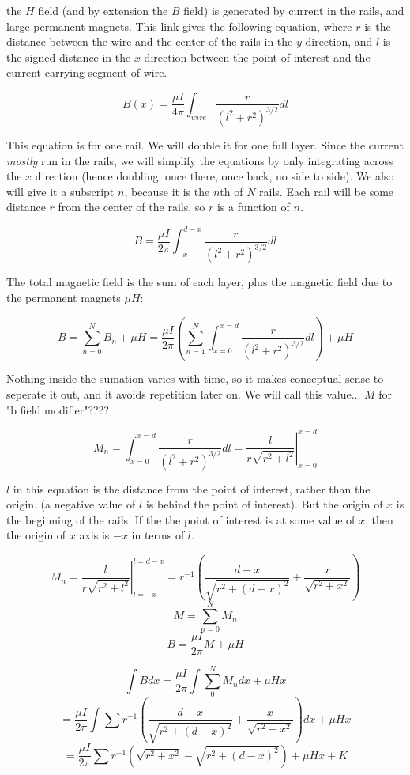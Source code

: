 \documentclass{article}
\begin{document}
the $H$ field (and by extension the $B$ field) is generated by current in the rails, and large permanent magnets. \href{https://pressbooks.online.ucf.edu/osuniversityphysics2/chapter/magnetic-field-due-to-a-thin-straight-wire/}{This} link gives the following equation, where $r$ is the distance between the wire and the center of the rails in the $y$ direction, and $l$ is the signed distance in the $x$ direction between the point of interest and the current carrying segment of wire.

\[B(x) = \frac{\mu I}{4\pi} \int_{wire}\frac{r}{(l^2+r^2)^{3/2}}dl\]

This equation is for one rail. We will double it for one full layer. Since the current \emph{mostly} run in the rails, we will simplify the equations by only integrating across the $x$ direction (hence doubling: once there, once back, no side to side). We also will give it a subscript $n$, because it is the $n$th of $N$ rails. Each rail will be some distance $r$ from the center of the rails, so $r$ is a function of $n$.

\[B = \frac{\mu I}{2\pi} \int_{-x}^{d-x}\frac{r}{(l^2+r^2)^{3/2}}dl\]

The total magnetic field is the sum of each layer, plus the magnetic field due to the permanent magnets $\mu H$:

\[B = \sum_{n=0}^{N}B_n + \mu H = \frac{\mu I}{2\pi} \left(\sum_{n=1}^{N} \int_{x=0}^{x=d}\frac{r}{(l^2+r^2)^{3/2}}dl\right) + \mu H\]

Nothing inside the sumation varies with time, so it makes conceptual sense to seperate it out, and it avoids repetition later on. We will call this value... $M$ for "b field modifier"????

\[M_n=\int_{x=0}^{x=d}\frac{r}{(l^2+r^2)^{3/2}}dl = \left .\frac{l}{r\sqrt{r^2+l^2}} \right\rvert_{x=0}^{x=d}\]

$l$ in this equation is the distance from the point of interest, rather than the origin. (a negative value of $l$ is behind the point of interest). But the origin of $x$ is the beginning of the rails. If the the point of interest is at some value of $x$, then the origin of $x$ axis is $-x$ in terms of $l$.

\[M_n=\left .\frac{l}{r\sqrt{r^2+l^2}} \right\rvert_{l=-x}^{l=d-x} = r^{-1}\left (\frac{d-x}{\sqrt{r^2+(d-x)^2}} + \frac{x}{\sqrt{r^2+x^2}}\right )\]
\[M = \sum_{n=0}^{N} M_n \]
\[B=\frac{\mu I}{2\pi}M + \mu H\]

\[ \int Bdx = \frac{\mu I}{2\pi} \int \sum_0^N M_ndx +\mu Hx\]
\[ = \frac{\mu I}{2\pi} \int \sum r^{-1}\left (\frac{d-x}{\sqrt{r^2+(d-x)^2}} + \frac{x}{\sqrt{r^2+x^2}}\right )dx +\mu Hx\]
\[ = \frac{\mu I}{2\pi} \sum r^{-1} ( \sqrt{r^2 + x^2} - \sqrt{r^2 + (d-x)^2}) + \mu Hx + K \]
\end{document}
